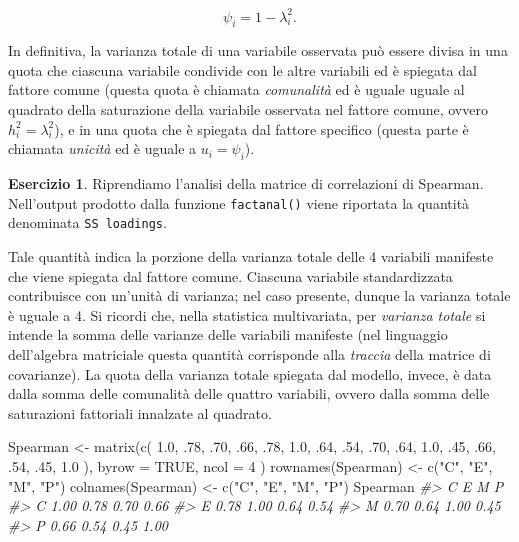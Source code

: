 \documentclass[
  11pt,
]{krantz}
\makeatletter
\newenvironment{Shaded}{\begin{snugshade}}{\end{snugshade}}
\newcommand{\AttributeTok}[1]{\textcolor[rgb]{0.61,0.61,0.61}{#1}}
\newcommand{\CommentTok}[1]{\textcolor[rgb]{0.37,0.37,0.37}{\textit{#1}}}
\newcommand{\ConstantTok}[1]{\textcolor[rgb]{0,0,0}{#1}}
\newcommand{\DecValTok}[1]{\textcolor[rgb]{0.06,0.06,0.06}{#1}}
\newcommand{\FloatTok}[1]{\textcolor[rgb]{0.06,0.06,0.06}{#1}}
\newcommand{\FunctionTok}[1]{\textcolor[rgb]{0,0,0}{#1}}
\newcommand{\NormalTok}[1]{#1}
\newcommand{\OtherTok}[1]{\textcolor[rgb]{0.37,0.37,0.37}{#1}}
\newcommand{\StringTok}[1]{\textcolor[rgb]{0.5,0.5,0.5}{#1}}
\newenvironment{kframe}{%
\medskip{}
\setlength{\fboxsep}{.8em}
 \def\at@end@of@kframe{}%
 \ifinner\ifhmode%
  \def\at@end@of@kframe{\end{minipage}}%
  \begin{minipage}{\columnwidth}%
 \fi\fi%
 \def\FrameCommand##1{\hskip\@totalleftmargin \hskip-\fboxsep
 \colorbox{shadecolor}{##1}\hskip-\fboxsep
     \hskip-\linewidth \hskip-\@totalleftmargin \hskip\columnwidth}%
 \MakeFramed {\advance\hsize-\width
   \@totalleftmargin\z@ \linewidth\hsize
   \@setminipage}}%
 {\par\unskip\endMakeFramed%
 \at@end@of@kframe}
\renewenvironment{Shaded}{\begin{kframe}}{\end{kframe}}
\theoremstyle{definition}
\theoremstyle{definition}
\theoremstyle{definition}
\newtheorem{exercise}{Esercizio}[chapter]
\theoremstyle{definition}
\theoremstyle{remark}
\makeatother
\begin{document}
\[
\psi_{i}=1-\lambda^2_i.
\]

In definitiva, la varianza totale di una variabile osservata può essere divisa in una quota che ciascuna variabile condivide con le altre variabili ed è spiegata dal fattore comune (questa quota è chiamata \emph{comunalità} ed è uguale uguale al quadrato della saturazione della variabile osservata nel fattore comune, ovvero \(h^2_i = \lambda_i^2\)), e in una quota che è spiegata dal fattore specifico (questa parte è chiamata \emph{unicità} ed è uguale a \(u_i = \psi_{i}\)).

\begin{exercise}
Riprendiamo l'analisi della matrice di correlazioni di Spearman. Nell'output prodotto dalla funzione \texttt{factanal()} viene riportata la quantità denominata \texttt{SS\ loadings}.

Tale quantità indica la porzione della varianza totale delle 4 variabili manifeste che viene spiegata dal fattore comune. Ciascuna variabile standardizzata contribuisce con un'unità di varianza; nel caso presente, dunque la varianza totale è uguale a 4. Si ricordi che, nella statistica multivariata, per \emph{varianza totale} si intende la somma delle varianze delle variabili manifeste (nel linguaggio dell'algebra matriciale questa quantità corrisponde alla \emph{traccia} della matrice di covarianze). La quota della varianza totale spiegata dal modello, invece, è data dalla somma delle comunalità delle quattro variabili, ovvero dalla somma delle saturazioni fattoriali innalzate al quadrato.

\begin{Shaded}
\begin{Highlighting}[]
\NormalTok{Spearman }\OtherTok{\textless{}{-}} \FunctionTok{matrix}\NormalTok{(}\FunctionTok{c}\NormalTok{(}
  \FloatTok{1.0}\NormalTok{, .}\DecValTok{78}\NormalTok{, .}\DecValTok{70}\NormalTok{, .}\DecValTok{66}\NormalTok{,}
\NormalTok{  .}\DecValTok{78}\NormalTok{, }\FloatTok{1.0}\NormalTok{, .}\DecValTok{64}\NormalTok{, .}\DecValTok{54}\NormalTok{,}
\NormalTok{  .}\DecValTok{70}\NormalTok{, .}\DecValTok{64}\NormalTok{, }\FloatTok{1.0}\NormalTok{, .}\DecValTok{45}\NormalTok{,}
\NormalTok{  .}\DecValTok{66}\NormalTok{, .}\DecValTok{54}\NormalTok{, .}\DecValTok{45}\NormalTok{, }\FloatTok{1.0}
\NormalTok{),}
\AttributeTok{byrow =} \ConstantTok{TRUE}\NormalTok{, }\AttributeTok{ncol =} \DecValTok{4}
\NormalTok{)}
\FunctionTok{rownames}\NormalTok{(Spearman) }\OtherTok{\textless{}{-}} \FunctionTok{c}\NormalTok{(}\StringTok{"C"}\NormalTok{, }\StringTok{"E"}\NormalTok{, }\StringTok{"M"}\NormalTok{, }\StringTok{"P"}\NormalTok{)}
\FunctionTok{colnames}\NormalTok{(Spearman) }\OtherTok{\textless{}{-}} \FunctionTok{c}\NormalTok{(}\StringTok{"C"}\NormalTok{, }\StringTok{"E"}\NormalTok{, }\StringTok{"M"}\NormalTok{, }\StringTok{"P"}\NormalTok{)}
\NormalTok{Spearman}
\CommentTok{\#\textgreater{}      C    E    M    P}
\CommentTok{\#\textgreater{} C 1.00 0.78 0.70 0.66}
\CommentTok{\#\textgreater{} E 0.78 1.00 0.64 0.54}
\CommentTok{\#\textgreater{} M 0.70 0.64 1.00 0.45}
\CommentTok{\#\textgreater{} P 0.66 0.54 0.45 1.00}
\end{Highlighting}
\end{Shaded}


\end{exercise}
\end{document}
